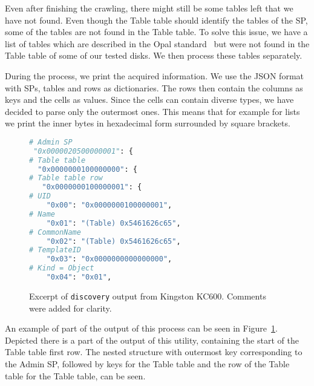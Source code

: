 Even after finishing the crawling, there might still be some tables left that we have not found. Even though the Table table should identify the tables of the SP, some of the tables are not found in the Table table. To solve this issue, we have a list of tables which are described in the Opal standard~\cite{tcg-opal2} but were not found in the Table table of some of our tested disks. We then process these tables separately.

During the process, we print the acquired information. We use the JSON format with SPs, tables and rows as dictionaries. The rows then contain the columns as keys and the cells as values. Since the cells can contain diverse types, we have decided to 
parse only the outermost ones. This means that for example for lists we print the inner bytes in hexadecimal form surrounded by square brackets.

\begin{figure}
    \centering
\begin{lstlisting}[language=Python]
# Admin SP
 "0x0000020500000001": {
# Table table
  "0x0000000100000000": {
# Table table row
   "0x0000000100000001": {
# UID
    "0x00": "0x0000000100000001",
# Name
    "0x01": "(Table) 0x5461626c65",
# CommonName
    "0x02": "(Table) 0x5461626c65",
# TemplateID
    "0x03": "0x0000000000000000",
# Kind = Object
    "0x04": "0x01",
\end{lstlisting}

    \caption{Excerpt of \texttt{discovery} output from Kingston KC600. Comments were added for clarity.}
    \label{fig:discovery_example}
\end{figure}

An example of part of the output of this process can be seen in Figure~\ref{fig:discovery_example}. Depicted there is a part of the output of this utility, containing the start of the Table table first row. The nested structure with outermost key corresponding to the Admin SP, followed by keys for the Table table and the row of the Table table for the Table table, can be seen. %

